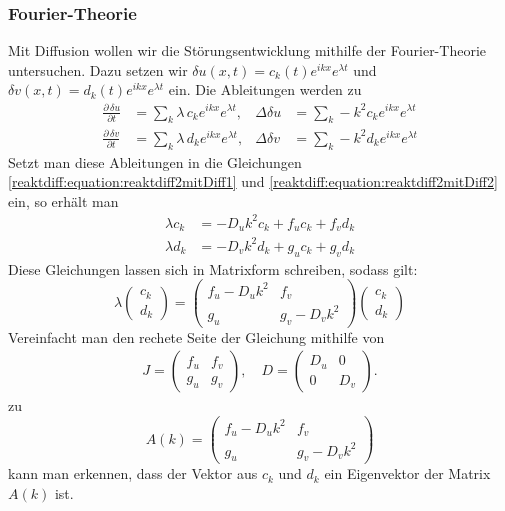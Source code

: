 \subsubsection{Fourier-Theorie}
Mit Diffusion wollen wir die Störungsentwicklung mithilfe der Fourier-Theorie untersuchen.
Dazu setzen wir \(\delta u(x,t) = c_k(t) e^{ikx} e^{\lambda t}\) und \(\delta v(x,t) = d_k(t) e^{ikx} e^{\lambda t}\) ein.
Die Ableitungen werden zu
\begin{align*}
    \frac{\partial\,\delta u}{\partial t} &= \sum_k \lambda\, c_k e^{i k x} e^{\lambda t}, &
    \Delta \delta u &= \sum_k -k^2 c_k e^{i k x} e^{\lambda t} \\
    \frac{\partial\,\delta v}{\partial t} &= \sum_k \lambda\, d_k e^{i k x} e^{\lambda t}, &
    \Delta \delta v &= \sum_k -k^2 d_k e^{i k x} e^{\lambda t}
\end{align*}
Setzt man diese Ableitungen in die Gleichungen \eqref{reaktdiff:equation:reaktdiff2mitDiff1} und \eqref{reaktdiff:equation:reaktdiff2mitDiff2} ein, so erhält man
    \begin{align*}
        \lambda c_k &= -D_u k^2 c_k + f_u c_k + f_v d_k \\
        \lambda d_k &= -D_v k^2 d_k + g_u c_k + g_v d_k
    \end{align*}
Diese Gleichungen lassen sich in Matrixform schreiben, sodass gilt:
\begin{equation*}
    \lambda
    \begin{pmatrix}
    c_k \\
    d_k
    \end{pmatrix}
    =
    \begin{pmatrix}
        f_u - D_u k^2 & f_v \\
        g_u & g_v - D_v k^2
    \end{pmatrix}
    \begin{pmatrix}
    c_k \\
    d_k
    \end{pmatrix}
\end{equation*}
Vereinfacht man den rechete Seite der Gleichung mithilfe von 
\begin{align}
    \label{reaktdiff:equation:reaktdiff2mitDiffFourierk}
    J =
    \begin{pmatrix}
        f_u & f_v\\
        g_u & g_v
    \end{pmatrix}, \quad
    D =
    \begin{pmatrix}
        D_u & 0\\
        0 & D_v
    \end{pmatrix}.
\end{align}
zu 
\begin{equation}
    \label{reaktdiff:equation:reaktdiff2mitDiffFourierkA}
    A(k) =
    \begin{pmatrix}
        f_u - D_u k^2 & f_v\\
        g_u & g_v - D_v k^2
    \end{pmatrix}
\end{equation}
kann man erkennen, dass der Vektor aus \(c_k\) und \(d_k\) ein Eigenvektor der Matrix \(A(k)\) ist.

